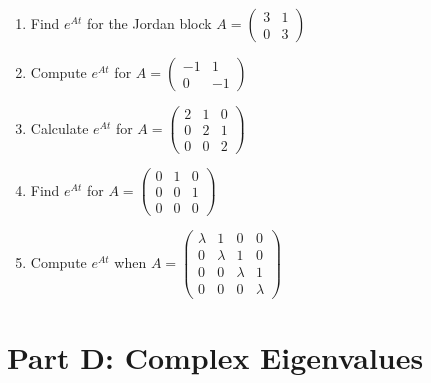 \documentclass[12pt]{article}
\begin{document}
\begin{enumerate}[start=11]
\item Find $e^{At}$ for the Jordan block $A = \begin{pmatrix} 3 & 1 \\ 0 & 3 \end{pmatrix}$

\item Compute $e^{At}$ for $A = \begin{pmatrix} -1 & 1 \\ 0 & -1 \end{pmatrix}$

\item Calculate $e^{At}$ for $A = \begin{pmatrix} 2 & 1 & 0 \\ 0 & 2 & 1 \\ 0 & 0 & 2 \end{pmatrix}$

\item Find $e^{At}$ for $A = \begin{pmatrix} 0 & 1 & 0 \\ 0 & 0 & 1 \\ 0 & 0 & 0 \end{pmatrix}$

\item Compute $e^{At}$ when $A = \begin{pmatrix} \lambda & 1 & 0 & 0 \\ 0 & \lambda & 1 & 0 \\ 0 & 0 & \lambda & 1 \\ 0 & 0 & 0 & \lambda \end{pmatrix}$
\end{enumerate}

\section*{Part D: Complex Eigenvalues}
\end{document}
